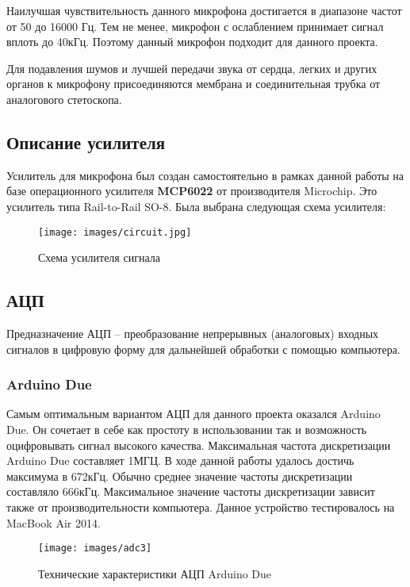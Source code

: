\documentclass[../main.tex]{subfiles}
\begin{document}
Наилучшая чувствительность данного микрофона достигается в диапазоне частот от 50 до 16000 Гц. Тем не менее, микрофон с ослаблением принимает сигнал вплоть до 40кГц. Поэтому данный микрофон подходит для данного проекта.

Для подавления шумов и лучшей передачи звука от сердца, легких и других органов к микрофону присоединяются мембрана и соединительная трубка от аналогового стетоскопа.

\subsection{Описание усилителя}
Усилитель для микрофона был создан самостоятельно в рамках данной работы на базе операционного усилителя \textbf{MCP6022} от производителя Microchip. Это усилитель типа Rail-to-Rail SO-8. Была выбрана следующая схема усилителя:

\begin{figure}[H]
\centering
\texttt{[image: images/circuit.jpg]}
\caption{Схема усилителя сигнала}
\end{figure}

\subsection{АЦП}
Предназначение АЦП – преобразование непрерывных (аналоговых) входных сигналов в цифровую форму для дальнейшей обработки с помощью компьютера.

\subsubsection{Arduino Due}

Самым оптимальным вариантом АЦП для данного проекта оказался Arduino Due. Он сочетает в себе как простоту в использовании так и возможность оцифровывать сигнал высокого качества. Максимальная частота дискретизации Arduino Due составляет 1МГЦ. В ходе данной работы удалось достичь максимума в 672кГц. Обычно среднее значение частоты дискретизации составляло 666кГц. Максимальное значение частоты дискретизации зависит также от производительности компьютера. Данное устройство тестировалось на MacBook Air 2014.

\begin{figure}[H]
\centering
\texttt{[image: images/adc3]}
\caption{Технические характеристики АЦП Arduino Due}
\end{figure}
\end{document}
